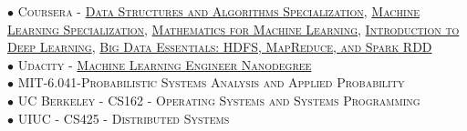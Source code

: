 \documentclass[10pt]{article}
\begin{document}
        $\bullet$ \textsc{Coursera - \href{https://www.coursera.org/account/accomplishments/specialization/certificate/AKFYZQ9QD8XH}{Data Structures and Algorithms Specialization}}, \textsc{\href{https://www.coursera.org/account/accomplishments/specialization/certificate/ZUGAFYKCMQ79}{Machine Learning Specialization}}, \textsc{\href{https://www.coursera.org/account/accomplishments/specialization/certificate/N3D6C3DT8QAY?utm_medium=certificate&utm_source=link&utm_campaign=copybutton_certificate}{Mathematics for Machine Learning}}, \textsc{\href{https://www.coursera.org/account/accomplishments/certificate/XN2B7T4AJX8C}{Introduction to Deep Learning}}, \textsc{\href{https://www.coursera.org/account/accomplishments/certificate/G25TQPPNXGW5}{Big Data Essentials: HDFS, MapReduce, and Spark RDD}} \\
        $\bullet$ \textsc{Udacity - \href{https://graduation.udacity.com/confirm/HK9JLR3N}{Machine Learning Engineer Nanodegree}} \\
        $\bullet$ \textsc{MIT-6.041-Probabilistic Systems Analysis and Applied Probability} \\
        $\bullet$ \textsc{UC Berkeley - CS162 - Operating Systems and Systems Programming} \\
        $\bullet$ \textsc{UIUC - CS425 - Distributed Systems}
\end{document}

